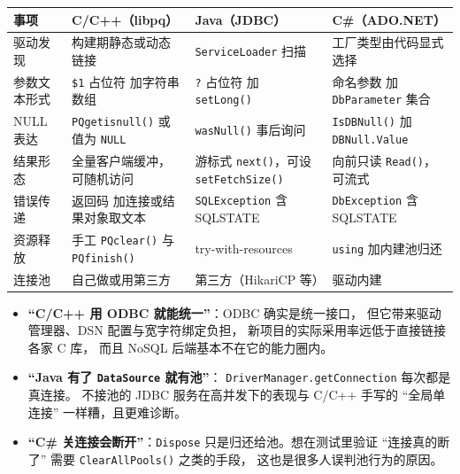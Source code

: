 \documentclass[12pt,a4paper,fontset=fandol]{ctexbook}
\newcommand{\Fn}[1]{\texttt{#1()}}
\newcommand{\Tp}[1]{\texttt{#1}}
\newcommand{\CSharp}{C\#}
\newcommand{\CppJava}{C/C++}
\begin{document}
\begin{footnotesize}
\begin{longtable}{@{}>{\raggedright\arraybackslash}p{}
                  >{\raggedright\arraybackslash}p{}
                  >{\raggedright\arraybackslash}p{}
                  >{\raggedright\arraybackslash}p{}@{}}
\toprule
\textbf{事项} & \textbf{\CppJava{}（libpq）} & \textbf{Java（JDBC）} &
\textbf{\CSharp{}（ADO.NET）} \\
\midrule
驱动发现 & 构建期静态或动态链接 & \Tp{ServiceLoader} 扫描 &
工厂类型由代码显式选择 \\
\addlinespace
参数文本形式 & \texttt{\$1} 占位符 加字符串数组 &
\texttt{?} 占位符 加 \Fn{setLong} &
命名参数 加 \Tp{DbParameter} 集合 \\
\addlinespace
NULL 表达 & \Fn{PQgetisnull} 或值为 \Tp{NULL} &
\Fn{wasNull} 事后询问 & \Fn{IsDBNull} 加 \Tp{DBNull.Value} \\
\addlinespace
结果形态 & 全量客户端缓冲，可随机访问 &
游标式 \Fn{next}，可设 \Fn{setFetchSize} &
向前只读 \Fn{Read}，可流式 \\
\addlinespace
错误传递 & 返回码 加连接或结果对象取文本 &
\Tp{SQLException} 含 SQLSTATE &
\Tp{DbException} 含 SQLSTATE \\
\addlinespace
资源释放 & 手工 \Fn{PQclear} 与 \Fn{PQfinish} &
try-with-resources & \Tp{using} 加内建池归还 \\
\addlinespace
连接池 & 自己做或用第三方 & 第三方（HikariCP 等） & 驱动内建 \\
\bottomrule
\end{longtable}
\end{footnotesize}

\begin{warning}[title=三个高频误判]
\begin{itemize}
  \item \textbf{``\CppJava{} 用 ODBC 就能统一''}：ODBC 确实是统一接口，
        但它带来驱动管理器、DSN 配置与宽字符绑定负担，
        新项目的实际采用率远低于直接链接各家 C 库，
        而且 NoSQL 后端基本不在它的能力圈内。
  \item \textbf{``Java 有了 \Tp{DataSource} 就有池''}：
        \Tp{DriverManager.\allowbreak getConnection} 每次都是真连接。
        不接池的 JDBC 服务在高并发下的表现与 \CppJava{} 手写的
        ``全局单连接'' 一样糟，且更难诊断。
  \item \textbf{``\CSharp{} 关连接会断开''}：\Tp{Dispose}
        只是归还给池。想在测试里验证 ``连接真的断了''
        需要 \Fn{ClearAllPools} 之类的手段，
        这也是很多人误判池行为的原因。
\end{itemize}
\end{warning}
\end{document}

